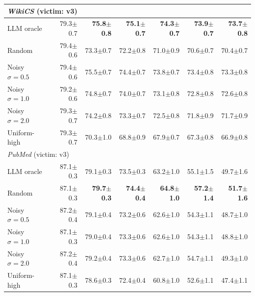 \documentclass{article}
\newcommand{\score}[2]{#1{\scriptsize$\pm$#2}}
\begin{document}
\begin{center}
\begin{tabular}{lrrrrrr}
\midrule
\multicolumn{7}{l}{\textit{WikiCS} (victim: v3)} \\
\midrule
LLM oracle           & \score{79.3}{0.7} & \textbf{\score{75.8}{0.8}} & \textbf{\score{75.1}{0.7}} & \textbf{\score{74.3}{0.7}} & \textbf{\score{73.9}{0.7}} & \textbf{\score{73.7}{0.8}} \\
Random               & \score{79.4}{0.6} & \score{73.3}{0.7} & \score{72.2}{0.8} & \score{71.0}{0.9} & \score{70.6}{0.7} & \score{70.4}{0.7} \\
Noisy $\sigma{=}0.5$ & \score{79.4}{0.6} & \score{75.5}{0.7} & \score{74.4}{0.7} & \score{73.8}{0.7} & \score{73.4}{0.8} & \score{73.3}{0.8} \\
Noisy $\sigma{=}1.0$ & \score{79.2}{0.6} & \score{74.8}{0.7} & \score{74.0}{0.7} & \score{73.1}{0.8} & \score{72.8}{0.8} & \score{72.6}{0.8} \\
Noisy $\sigma{=}2.0$ & \score{79.3}{0.7} & \score{74.2}{0.8} & \score{73.3}{0.7} & \score{72.5}{0.8} & \score{71.8}{0.9} & \score{71.7}{0.9} \\
Uniform-high         & \score{79.3}{0.7} & \score{70.3}{1.0} & \score{68.8}{0.9} & \score{67.9}{0.7} & \score{67.3}{0.8} & \score{66.9}{0.8} \\
\midrule
\multicolumn{7}{l}{\textit{PubMed} (victim: v3)} \\
\midrule
LLM oracle           & \score{87.1}{0.3} & \score{79.1}{0.3} & \score{73.5}{0.3} & \score{63.2}{1.0} & \score{55.1}{1.5} & \score{49.7}{1.6} \\
Random               & \score{87.1}{0.3} & \textbf{\score{79.7}{0.3}} & \textbf{\score{74.4}{0.4}} & \textbf{\score{64.8}{1.0}} & \textbf{\score{57.2}{1.4}} & \textbf{\score{51.7}{1.6}} \\
Noisy $\sigma{=}0.5$ & \score{87.2}{0.4} & \score{79.1}{0.4} & \score{73.2}{0.6} & \score{62.6}{1.0} & \score{54.3}{1.1} & \score{48.7}{1.0} \\
Noisy $\sigma{=}1.0$ & \score{87.1}{0.3} & \score{79.0}{0.4} & \score{73.3}{0.6} & \score{62.6}{1.0} & \score{54.3}{1.1} & \score{48.8}{1.0} \\
Noisy $\sigma{=}2.0$ & \score{87.2}{0.4} & \score{79.2}{0.4} & \score{73.3}{0.6} & \score{62.7}{1.0} & \score{54.7}{1.1} & \score{49.3}{1.0} \\
Uniform-high         & \score{87.1}{0.3} & \score{78.6}{0.3} & \score{72.4}{0.4} & \score{60.8}{1.0} & \score{52.6}{1.1} & \score{47.4}{1.1} \\
\bottomrule
\end{tabular}
\end{center}
\end{document}
